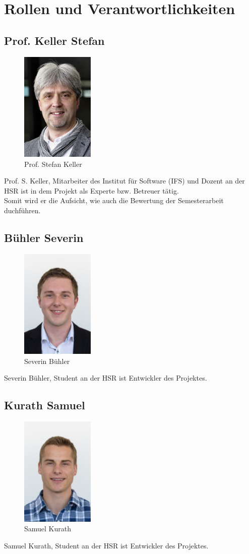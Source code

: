 \section{Rollen und Verantwortlichkeiten}
\subsection{Prof. Keller Stefan}
\begin{figure}[H]
	\centering
	\includegraphics[width=35mm]{images/Skeller.jpg}
	\caption{Prof. Stefan Keller}
\end{figure}

Prof. S. Keller, Mitarbeiter des Institut für Software (IFS) und Dozent an
der HSR ist in dem Projekt als Experte bzw. Betreuer tätig. \\
Somit wird er die Aufsicht, wie auch die Bewertung der Semesterarbeit duchführen.

\subsection{Bühler Severin}
\begin{figure}[H]
	\centering
	\includegraphics[width=35mm]{images/sbuehler.jpg}
	\caption{Severin Bühler}
\end{figure}
Severin Bühler, Student an der HSR ist Entwickler des Projektes.

\subsection{Kurath Samuel}
\begin{figure}[H]
	\centering
	\includegraphics[width=35mm]{images/skurath.jpg}
	\caption{Samuel Kurath}
\end{figure}
Samuel Kurath, Student an der HSR ist Entwickler des Projektes.
